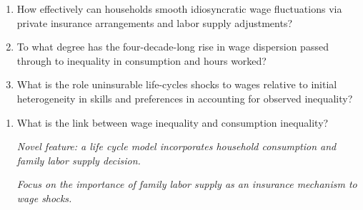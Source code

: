 \documentclass[notes=show]{beamer}
\begin{document}
\begin{frame}%


\begin{enumerate}
\item How effectively can households smooth idiosyncratic wage fluctuations
via private insurance arrangements and labor supply adjustments?

\item To what degree has the four-decade-long rise in wage dispersion passed
through to inequality in consumption and hours worked?

\item What is the role uninsurable life-cycles shocks to wages relative to
initial heterogeneity in skills and preferences in accounting for observed
inequality?
\end{enumerate}

\transboxout%
\end{frame}%

\bigskip

\begin{frame}%


\begin{enumerate}
\item What is the link between wage inequality and consumption inequality?

\textit{Novel feature: a life cycle model incorporates household consumption
and family labor supply decision.}

\textit{Focus on the importance of family labor supply as an insurance
mechanism to wage shocks.}
\end{enumerate}

\transboxout%
\end{frame}%
\end{document}
